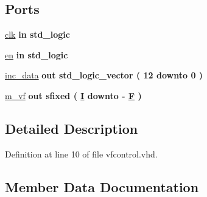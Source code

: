 \subsection*{Ports}
 \begin{DoxyCompactItemize}
\item 
\hyperlink{classvfcontrol_a4a4609c199d30b3adebbeb3a01276ec5}{clk}  {\bfseries {\bfseries \textcolor{keywordflow}{in}\textcolor{vhdlchar}{ }}} {\bfseries \textcolor{comment}{std\+\_\+logic}\textcolor{vhdlchar}{ }} 
\item 
\hyperlink{classvfcontrol_adcf9c6f5161d039addbda5819bee64a3}{en}  {\bfseries {\bfseries \textcolor{keywordflow}{in}\textcolor{vhdlchar}{ }}} {\bfseries \textcolor{comment}{std\+\_\+logic}\textcolor{vhdlchar}{ }} 
\item 
\hyperlink{classvfcontrol_af402b7ce8e1b9ac1038c575460c5d156}{inc\+\_\+data}  {\bfseries {\bfseries \textcolor{keywordflow}{out}\textcolor{vhdlchar}{ }}} {\bfseries \textcolor{comment}{std\+\_\+logic\+\_\+vector}\textcolor{vhdlchar}{ }\textcolor{vhdlchar}{(}\textcolor{vhdlchar}{ }\textcolor{vhdlchar}{ } \textcolor{vhdldigit}{12} \textcolor{vhdlchar}{ }\textcolor{keywordflow}{downto}\textcolor{vhdlchar}{ }\textcolor{vhdlchar}{ } \textcolor{vhdldigit}{0} \textcolor{vhdlchar}{ }\textcolor{vhdlchar}{)}\textcolor{vhdlchar}{ }} 
\item 
\hyperlink{classvfcontrol_a556e3576ef1696c57d447032f986bf5a}{m\+\_\+vf}  {\bfseries {\bfseries \textcolor{keywordflow}{out}\textcolor{vhdlchar}{ }}} {\bfseries \textcolor{comment}{sfixed}\textcolor{vhdlchar}{ }\textcolor{vhdlchar}{(}\textcolor{vhdlchar}{ }\textcolor{vhdlchar}{ }\textcolor{vhdlchar}{ }\textcolor{vhdlchar}{ }{\bfseries \hyperlink{classvfcontrol_abb7ce405d45a733b6db94314a4f791fd}{I}} \textcolor{vhdlchar}{ }\textcolor{keywordflow}{downto}\textcolor{vhdlchar}{ }\textcolor{vhdlchar}{-\/}\textcolor{vhdlchar}{ }\textcolor{vhdlchar}{ }\textcolor{vhdlchar}{ }{\bfseries \hyperlink{classvfcontrol_aac2d6825f96b21ae984648cc93554339}{F}} \textcolor{vhdlchar}{ }\textcolor{vhdlchar}{)}\textcolor{vhdlchar}{ }} 
\end{DoxyCompactItemize}


\subsection{Detailed Description}


Definition at line 10 of file vfcontrol.\+vhd.



\subsection{Member Data Documentation}
\hypertarget{classvfcontrol_a4a4609c199d30b3adebbeb3a01276ec5}{}

